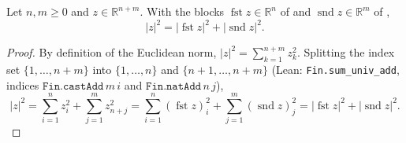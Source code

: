 \begin{lemma}[Pythagoras for the splitting $\mathbb R^{n+m}=\mathbb R^n\times\mathbb R^m$]
Let $n,m\ge0$ and $z\in\mathbb R^{n+m}$. With the blocks $\operatorname{fst}z\in\mathbb R^n$ of  and $\operatorname{snd}z\in\mathbb R^m$ of ,
\[
|z|^2=|\operatorname{fst}z|^2+|\operatorname{snd}z|^2 .
\]
\end{lemma}
\begin{proof}
By definition of the Euclidean norm, $|z|^2=\sum_{k=1}^{n+m}z_k^2$. Splitting the index set $\{1,\dots,n+m\}$ into $\{1,\dots,n\}$ and $\{n+1,\dots,n+m\}$ (Lean: \texttt{Fin.sum\_univ\_add}, indices $\texttt{Fin.castAdd}\,m\,i$ and $\texttt{Fin.natAdd}\,n\,j$),
\[
|z|^2=\sum_{i=1}^nz_i^2+\sum_{j=1}^mz_{n+j}^2=\sum_{i=1}^n(\operatorname{fst}z)_i^2+\sum_{j=1}^m(\operatorname{snd}z)_j^2=|\operatorname{fst}z|^2+|\operatorname{snd}z|^2 .
\]
\end{proof}

